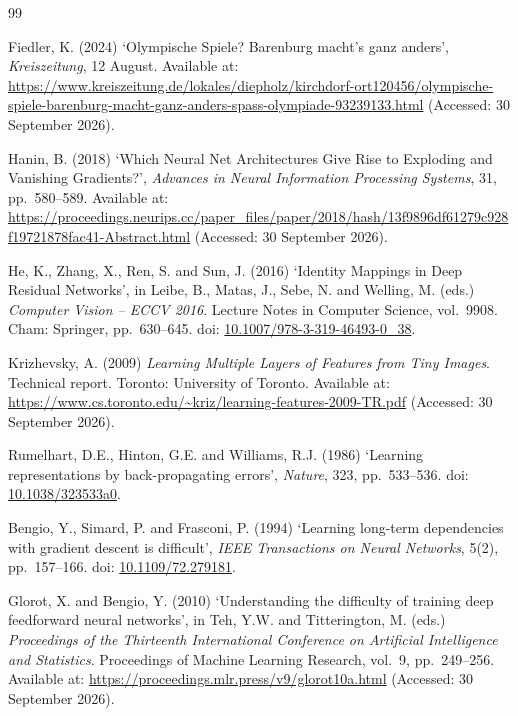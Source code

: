 \documentclass[12pt]{article}
\begin{document}
\clearpage
\renewcommand{\refname}{Tài liệu tham khảo}
\begin{thebibliography}{99}

Fiedler, K. (2024) `Olympische Spiele? Barenburg macht's ganz anders',
\textit{Kreiszeitung}, 12 August. Available at:
\url{https://www.kreiszeitung.de/lokales/diepholz/kirchdorf-ort120456/olympische-spiele-barenburg-macht-ganz-anders-spass-olympiade-93239133.html}
(Accessed: 30 September 2026).

Hanin, B. (2018) `Which Neural Net Architectures Give Rise to Exploding and
Vanishing Gradients?', \textit{Advances in Neural Information Processing
Systems}, 31, pp.~580--589. Available at:
\url{https://proceedings.neurips.cc/paper_files/paper/2018/hash/13f9896df61279c928f19721878fac41-Abstract.html}
(Accessed: 30 September 2026).

He, K., Zhang, X., Ren, S. and Sun, J. (2016) `Identity Mappings in Deep
Residual Networks', in Leibe, B., Matas, J., Sebe, N. and Welling, M. (eds.)
\textit{Computer Vision -- ECCV 2016}. Lecture Notes in Computer Science,
vol.~9908. Cham: Springer, pp.~630--645.
doi: \href{https://doi.org/10.1007/978-3-319-46493-0_38}{10.1007/978-3-319-46493-0\_38}.

Krizhevsky, A. (2009) \textit{Learning Multiple Layers of Features from Tiny
Images}. Technical report. Toronto: University of Toronto. Available at:
\url{https://www.cs.toronto.edu/~kriz/learning-features-2009-TR.pdf}
(Accessed: 30 September 2026).

Rumelhart, D.E., Hinton, G.E. and Williams, R.J. (1986) `Learning
representations by back-propagating errors', \textit{Nature}, 323,
pp.~533--536. doi:
\href{https://doi.org/10.1038/323533a0}{10.1038/323533a0}.

Bengio, Y., Simard, P. and Frasconi, P. (1994) `Learning long-term
dependencies with gradient descent is difficult', \textit{IEEE Transactions
on Neural Networks}, 5(2), pp.~157--166. doi:
\href{https://doi.org/10.1109/72.279181}{10.1109/72.279181}.

Glorot, X. and Bengio, Y. (2010) `Understanding the difficulty of training
deep feedforward neural networks', in Teh, Y.W. and Titterington, M. (eds.)
\textit{Proceedings of the Thirteenth International Conference on Artificial
Intelligence and Statistics}. Proceedings of Machine Learning Research,
vol.~9, pp.~249--256. Available at:
\url{https://proceedings.mlr.press/v9/glorot10a.html}
(Accessed: 30 September 2026).


\end{thebibliography}
\end{document}
